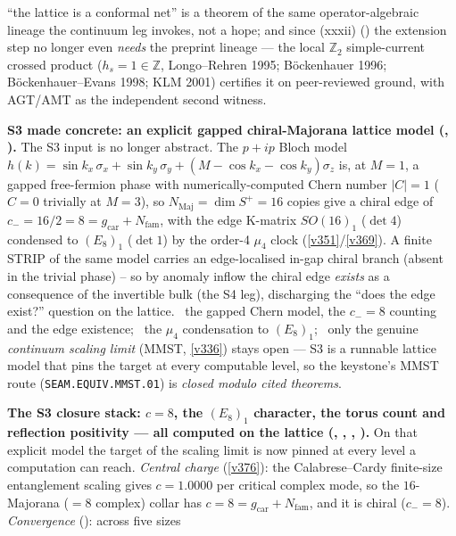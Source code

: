 \documentclass[11pt,a4paper]{article}
\newcommand{\Nfam}{N_{\mathrm{fam}}}
\newcommand{\gcar}{g_{\mathrm{car}}}
\newcommand{\Z}{\mathbb Z}
\begin{document}
\begin{keybox}
``the lattice is a conformal net'' is a theorem of the same operator-algebraic lineage the continuum leg invokes,
not a hope; and since (xxxii) () the extension step no longer even
\emph{needs} the preprint lineage --- the local $\Z_2$ simple-current crossed product ($h_s{=}1{\in}\Z$,
Longo--Rehren 1995; B\"ockenhauer 1996; B\"ockenhauer--Evans 1998; KLM 2001) certifies it on peer-reviewed
ground, with AGT/AMT as the independent second witness.
\par\smallskip\noindent\textbf{S3 made concrete: an explicit gapped chiral-Majorana lattice model
(, ).} The S3 input is no longer
abstract. The $p{+}ip$ Bloch model $h(k){=}\sin k_x\,\sigma_x{+}\sin k_y\,\sigma_y{+}(M{-}\cos k_x{-}\cos
k_y)\sigma_z$ is, at $M{=}1$, a gapped free-fermion phase with numerically-computed Chern number $|C|{=}1$
($C{=}0$ trivially at $M{=}3$), so $N_{\mathrm{Maj}}{=}\dim S^+{=}16$ copies give a chiral edge of
$c_-{=}16/2{=}8{=}\gcar{+}\Nfam$, with the edge K-matrix $SO(16)_1$ ($\det 4$) condensed to $(E_8)_1$
($\det 1$) by the order-4 $\mu_4$ clock (\vref{v351}/\vref{v369}). A finite STRIP of the same model carries
an edge-localised in-gap chiral branch (absent in the trivial phase) -- so by anomaly inflow the chiral edge
\emph{exists} as a consequence of the invertible bulk (the S4 leg), discharging the ``does the edge exist?''
question on the lattice. \mE\ the gapped Chern model, the $c_-{=}8$ counting and the edge existence; \mC\ the
$\mu_4$ condensation to $(E_8)_1$; \mO\ only the genuine \emph{continuum scaling limit} (MMST, \vref{v336}) stays
open --- S3 is a runnable lattice model that pins the target at every computable level, so the keystone's MMST
route (\texttt{SEAM.EQUIV.MMST.01}) is
\emph{closed modulo cited theorems}.
\par\smallskip\noindent\textbf{The S3 closure stack: $c=8$, the $(E_8)_1$ character, the torus count and
reflection positivity --- all computed on the lattice (,
, , ).}
On that explicit model the target of the scaling limit is now pinned at every level a computation can
reach. \emph{Central charge} (\vref{v376}): the Calabrese--Cardy finite-size entanglement scaling gives
$c=1.0000$ per critical complex mode, so the $16$-Majorana ($=8$ complex) collar has $c=8=\gcar{+}\Nfam$,
and it is chiral ($c_-=8$). \emph{Convergence} (): across five sizes

\end{keybox}
\end{document}
